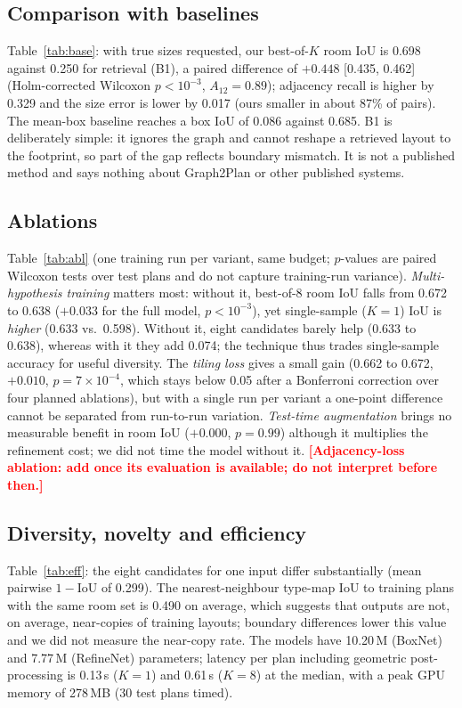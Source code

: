 \documentclass[conference]{IEEEtran}
\newcommand{\todo}[1]{\textcolor{red}{\textbf{[#1]}}}
\begin{document}
\subsection{Comparison with baselines}
Table~\ref{tab:base}: with true sizes requested, our best-of-$K$ room IoU is 0.698 against 0.250 for retrieval (B1), a paired difference of $+0.448$ [0.435, 0.462] (Holm-corrected Wilcoxon $p<10^{-3}$, $A_{12}=0.89$); adjacency recall is higher by 0.329 and the size error is lower by 0.017 (ours smaller in about 87\% of pairs). The mean-box baseline reaches a box IoU of 0.086 against 0.685. B1 is deliberately simple: it ignores the graph and cannot reshape a retrieved layout to the footprint, so part of the gap reflects boundary mismatch. It is not a published method and says nothing about Graph2Plan or other published systems.

\subsection{Ablations}
Table~\ref{tab:abl} (one training run per variant, same budget; $p$-values are paired Wilcoxon tests over test plans and do not capture training-run variance). \emph{Multi-hypothesis training} matters most: without it, best-of-8 room IoU falls from 0.672 to 0.638 ($+0.033$ for the full model, $p<10^{-3}$), yet single-sample ($K{=}1$) IoU is \emph{higher} (0.633 vs.\ 0.598). Without it, eight candidates barely help (0.633 to 0.638), whereas with it they add 0.074; the technique thus trades single-sample accuracy for useful diversity. The \emph{tiling loss} gives a small gain (0.662 to 0.672, $+0.010$, $p=7\times10^{-4}$, which stays below 0.05 after a Bonferroni correction over four planned ablations), but with a single run per variant a one-point difference cannot be separated from run-to-run variation. \emph{Test-time augmentation} brings no measurable benefit in room IoU ($+0.000$, $p=0.99$) although it multiplies the refinement cost; we did not time the model without it. \todo{Adjacency-loss ablation: add once its evaluation is available; do not interpret before then.}

\subsection{Diversity, novelty and efficiency}
Table~\ref{tab:eff}: the eight candidates for one input differ substantially (mean pairwise $1-$IoU of 0.299). The nearest-neighbour type-map IoU to training plans with the same room set is 0.490 on average, which suggests that outputs are not, on average, near-copies of training layouts; boundary differences lower this value and we did not measure the near-copy rate. The models have 10.20\,M (BoxNet) and 7.77\,M (RefineNet) parameters; latency per plan including geometric post-processing is 0.13\,s ($K{=}1$) and 0.61\,s ($K{=}8$) at the median, with a peak GPU memory of 278\,MB (30 test plans timed).
\end{document}
